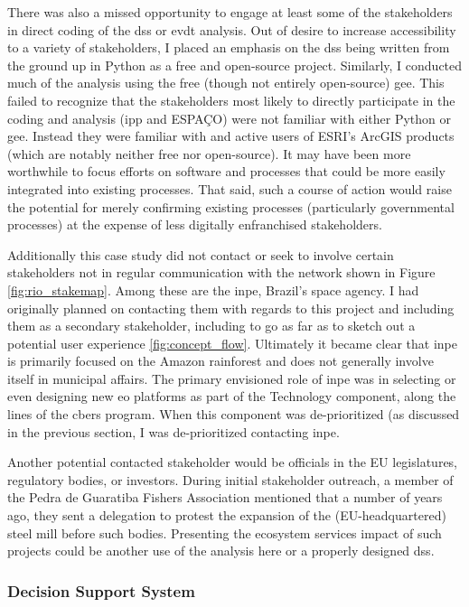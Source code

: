 There was also a missed opportunity to engage at least some of the stakeholders in direct coding of the \ac{dss} or \ac{evdt} analysis. Out of desire to increase accessibility to a variety of stakeholders, I placed an emphasis on the \ac{dss} being written from the ground up in Python as a free and open-source project. Similarly, I conducted much of the analysis using the free (though not entirely open-source) \ac{gee}. This failed to recognize that the stakeholders most likely to directly participate in the coding and analysis (\ac{ipp} and ESPAÇO) were not familiar with either Python or \ac{gee}. Instead they were familiar with and active users of ESRI's ArcGIS products (which are notably neither free nor open-source). It may have been more worthwhile to focus efforts on software and processes that could be more easily integrated into existing processes. That said, such a course of action would raise the potential for merely confirming existing processes (particularly governmental processes) at the expense of less digitally enfranchised stakeholders. 

Additionally this case study did not contact or seek to involve certain stakeholders not in regular communication with the network shown in Figure \ref{fig:rio_stakemap}. Among these are the \ac{inpe}, Brazil's space agency. I had originally planned on contacting them with regards to this project and including them as a secondary stakeholder, including to go as far as to sketch out a potential user experience \ref{fig:concept_flow}. Ultimately it became clear that \ac{inpe} is primarily focused on the Amazon rainforest and does not generally involve itself in municipal affairs. The primary envisioned role of \ac{inpe} was in selecting or even designing new \ac{eo} platforms as part of the Technology component, along the lines of the \ac{cbers} program. When this component was de-prioritized (as discussed in the previous section, I was de-prioritized contacting \ac{inpe}. 

Another potential contacted stakeholder would be officials in the EU legislatures, regulatory bodies, or investors. During initial stakeholder outreach, a member of the Pedra de Guaratiba Fishers Association mentioned that a number of years ago, they sent a delegation to protest the expansion of the (EU-headquartered) steel mill before such bodies. Presenting the ecosystem services impact of such projects could be another use of the analysis here or a properly designed \ac{dss}. 

\subsubsection{Decision Support System}

